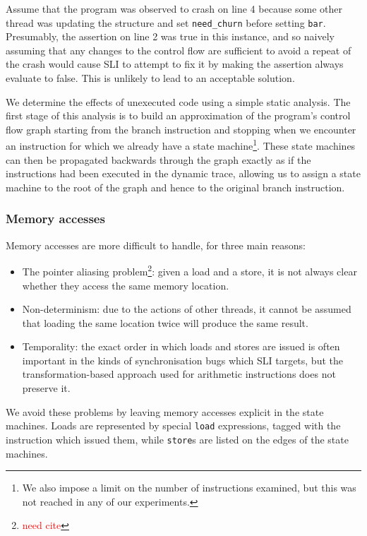 \documentclass[10pt,twocolumn,preprint,natbib,authoryear]{sigplanconf}
\newcommand{\editorial}[1]{\textcolor{red}{\footnote{\textcolor{red}{#1}}}}
\newcommand{\needCite}{\editorial{need cite}}
\begin{document}
Assume that the program was observed to crash on line 4 because some
other thread was updating the structure and set \verb|need_churn|
before setting \verb|bar|.  Presumably, the assertion on line 2 was
true in this instance, and so naively assuming that any changes to the
control flow are sufficient to avoid a repeat of the crash would cause
SLI to attempt to fix it by making the assertion always evaluate to
false.  This is unlikely to lead to an acceptable solution.

We determine the effects of unexecuted code using a simple static
analysis.  The first stage of this analysis is to build an
approximation of the program's control flow graph starting from the
branch instruction and stopping when we encounter an instruction for
which we already have a state machine\footnote{We also impose a limit
  on the number of instructions examined, but this was not reached in
  any of our experiments.}.  These state machines can then be
propagated backwards through the graph exactly as if the instructions
had been executed in the dynamic trace, allowing us to assign a state
machine to the root of the graph and hence to the original branch
instruction.

\subsubsection{Memory accesses}

Memory accesses are more difficult to handle, for three main reasons:

\begin{itemize}
\item The pointer aliasing problem\needCite{}: given a load and a
  store, it is not always clear whether they access the same memory
  location.
\item Non-determinism: due to the actions of other threads, it cannot
  be assumed that loading the same location twice will produce the
  same result.
\item Temporality: the exact order in which loads and stores are
  issued is often important in the kinds of synchronisation bugs which
  SLI targets, but the transformation-based approach used for
  arithmetic instructions does not preserve it.
\end{itemize}

We avoid these problems by leaving memory accesses explicit in the
state machines.  Loads are represented by special \verb|load|
expressions, tagged with the instruction which issued them, while
\verb|store|s are listed on the edges of the state machines.
\end{document}

